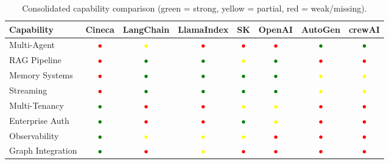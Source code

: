 \begin{table}[ht]
\centering
\caption{Consolidated capability comparison (green = strong, yellow = partial, red = weak/missing).}
\label{tab:consolidated-comparison}
\small
\setlength{\tabcolsep}{2.5pt}
\begin{tabular}{lccccccc}
\hline
\textbf{Capability} & \textbf{Cineca} & \textbf{LangChain} & \textbf{LlamaIndex} & \textbf{SK} & \textbf{OpenAI} & \textbf{AutoGen} & \textbf{crewAI} \\
\hline
Multi-Agent & \textcolor{red}{$\bullet$} & \textcolor{yellow}{$\bullet$} & \textcolor{red}{$\bullet$} & \textcolor{red}{$\bullet$} & \textcolor{red}{$\bullet$} & \textcolor{green}{$\bullet$} & \textcolor{green}{$\bullet$} \\
RAG Pipeline & \textcolor{red}{$\bullet$} & \textcolor{green}{$\bullet$} & \textcolor{green}{$\bullet$} & \textcolor{yellow}{$\bullet$} & \textcolor{green}{$\bullet$} & \textcolor{red}{$\bullet$} & \textcolor{red}{$\bullet$} \\
Memory Systems & \textcolor{red}{$\bullet$} & \textcolor{green}{$\bullet$} & \textcolor{green}{$\bullet$} & \textcolor{green}{$\bullet$} & \textcolor{green}{$\bullet$} & \textcolor{yellow}{$\bullet$} & \textcolor{yellow}{$\bullet$} \\
Streaming & \textcolor{red}{$\bullet$} & \textcolor{green}{$\bullet$} & \textcolor{green}{$\bullet$} & \textcolor{green}{$\bullet$} & \textcolor{green}{$\bullet$} & \textcolor{yellow}{$\bullet$} & \textcolor{yellow}{$\bullet$} \\
Multi-Tenancy & \textcolor{green}{$\bullet$} & \textcolor{red}{$\bullet$} & \textcolor{red}{$\bullet$} & \textcolor{yellow}{$\bullet$} & \textcolor{yellow}{$\bullet$} & \textcolor{red}{$\bullet$} & \textcolor{red}{$\bullet$} \\
Enterprise Auth & \textcolor{green}{$\bullet$} & \textcolor{red}{$\bullet$} & \textcolor{red}{$\bullet$} & \textcolor{green}{$\bullet$} & \textcolor{yellow}{$\bullet$} & \textcolor{red}{$\bullet$} & \textcolor{red}{$\bullet$} \\
Observability & \textcolor{green}{$\bullet$} & \textcolor{yellow}{$\bullet$} & \textcolor{yellow}{$\bullet$} & \textcolor{yellow}{$\bullet$} & \textcolor{red}{$\bullet$} & \textcolor{red}{$\bullet$} & \textcolor{red}{$\bullet$} \\
Graph Integration & \textcolor{green}{$\bullet$} & \textcolor{red}{$\bullet$} & \textcolor{yellow}{$\bullet$} & \textcolor{red}{$\bullet$} & \textcolor{red}{$\bullet$} & \textcolor{red}{$\bullet$} & \textcolor{red}{$\bullet$} \\

\end{tabular}
\end{table}
